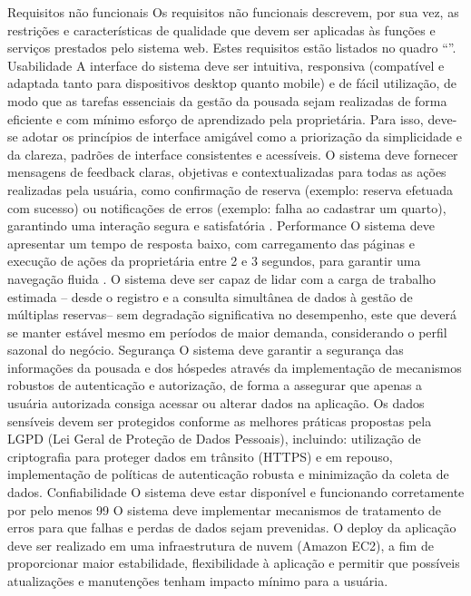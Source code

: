Requisitos não funcionais 
Os requisitos não funcionais descrevem, por sua vez, as restrições e características de qualidade que devem ser aplicadas às funções e serviços prestados pelo sistema web. Estes requisitos estão listados no quadro “”.
Usabilidade
	A interface do sistema deve ser intuitiva, responsiva (compatível e adaptada tanto para dispositivos desktop quanto mobile)  e de fácil utilização, de modo que as tarefas essenciais da gestão da pousada sejam realizadas de forma eficiente e com mínimo esforço de aprendizado pela proprietária.  Para isso, deve-se adotar os princípios de interface amigável como a priorização da simplicidade e da clareza, padrões de interface consistentes e acessíveis.
	O sistema deve fornecer mensagens de feedback claras, objetivas e contextualizadas para  todas as ações  realizadas pela usuária, como confirmação de reserva (exemplo: reserva efetuada com sucesso) ou notificações de erros (exemplo: falha ao cadastrar um quarto), garantindo uma interação segura e  satisfatória .
	Performance
	O sistema deve apresentar um tempo de resposta baixo, com carregamento das páginas e execução de ações da proprietária entre 2 e 3 segundos, para garantir uma navegação fluida .
	O sistema deve ser capaz de lidar com a carga de trabalho estimada – desde o registro e a consulta simultânea de dados à gestão de múltiplas reservas– sem degradação significativa no desempenho, este que deverá se manter estável mesmo em períodos de maior demanda, considerando o perfil sazonal do negócio. 
	Segurança
	O sistema deve garantir a segurança das informações da pousada e dos hóspedes através da implementação de mecanismos robustos de autenticação e autorização, de forma a assegurar que apenas a usuária autorizada consiga acessar ou alterar dados na aplicação.
	Os dados sensíveis devem ser protegidos conforme as melhores práticas propostas pela LGPD (Lei Geral de Proteção de Dados Pessoais), incluindo: utilização de criptografia para proteger dados em trânsito (HTTPS) e em repouso, implementação de políticas de autenticação robusta e minimização da coleta de dados.
	Confiabilidade
	O sistema deve estar disponível e funcionando corretamente por pelo menos  99%
	O sistema deve implementar mecanismos de tratamento de erros para que falhas e perdas de dados sejam prevenidas.  
	O deploy da aplicação deve ser realizado em uma infraestrutura de nuvem (Amazon EC2),  a fim de proporcionar maior estabilidade, flexibilidade à aplicação e permitir que possíveis atualizações e manutenções tenham impacto mínimo para a usuária.
